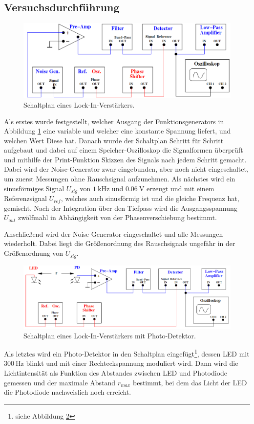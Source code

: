 \subsection{Versuchsdurchführung}
\begin{figure}
  \centering
  \includegraphics[scale=0.3]{durch.png}
  \caption{Schaltplan eines Lock-In-Verstärkers.}
  \label{fig:3}
\end{figure}
Als erstes wurde festgestellt, welcher Ausgang der Funktionsgenerators in Abbildung
\ref{fig:3} eine variable und welcher eine konstante Spannung liefert, und welchen
Wert Diese hat. Danach wurde der Schaltplan Schritt für Schritt aufgebaut und dabei
auf einem Speicher-Oszilloskop die Signalformen überprüft und mithilfe der Print-Funktion
Skizzen des Signals nach jedem Schritt gemacht. Dabei wird der Noise-Generator
zwar eingebunden, aber noch nicht eingeschaltet, um zuerst Messungen ohne Rauschsignal
aufzunehmen. Als nächstes wird ein sinusförmiges Signal $U_{sig}$ von 
$\SI{1}{\kilo\hertz}$ und $\SI{0.06}{\volt}$ erzeugt und mit einem Referenzsignal
$U_{ref}$, welches auch sinusförmig ist und die gleiche Frequenz hat, gemischt.
Nach der Integration über den Tiefpass wird die Ausgangsspannung $U_{out}$
zwölfmahl in Abhängigkeit von der Phasenverschiebung bestimmt.

Anschließend wird der Noise-Generator eingeschaltet und alle Messungen wiederholt.
Dabei liegt die Größenordnung des Rauschsignals ungefähr in der Größenordnung
von $U_{sig}$.

\begin{figure}
  \centering
  \includegraphics[scale=0.3]{durch2.png}
  \caption{Schaltplan eines Lock-In-Verstärkers mit Photo-Detektor.}
  \label{fig:4}
\end{figure}
Als letztes wird ein Photo-Detektor in den Schaltplan eingefügt\footnote{siehe Abbildung \ref{fig:4}},
dessen LED mit $\SI{300}{\hertz}$
blinkt und mit einer Rechteckspannung moduliert wird. Dann wird die Lichtintensität
als Funktion des Abstandes zwischen LED und Photodiode gemessen und der maximale
Abstand $r_{max}$ bestimmt, bei dem das Licht der LED die Photodiode nachweislich
noch erreicht.


